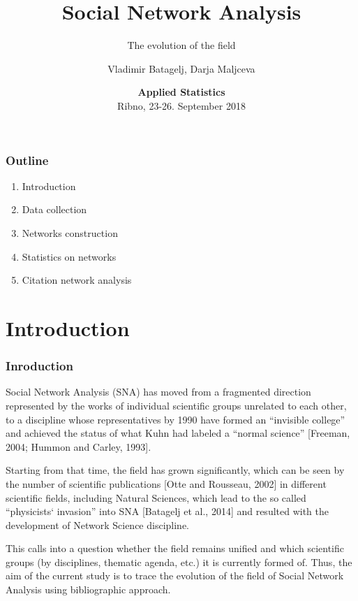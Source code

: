 \documentclass[hyperref={pdfstartview={FitBH -32768},
                         pdfpagemode=FullScreen,
                         plainpages=false,
                         colorlinks=true}
              ]{beamer}
\title[SNA. Evolution of the field]{\textbf{Social Network Analysis}}\subtitle{The evolution of the field}
\author[V. Batagelj, D. Maltseva]{Vladimir Batagelj, Darja Maljceva}
\institute[IMFM \& IAM UP]{IMFM Ljubljana, IAM UP Koper and NRU HSE Moscow }
\date[September 23-26, 2018]{\small
\textcolor{BrickRed}{\textbf{Applied Statistics}} \\
Ribno, 23-26. September 2018}
\newcommand{\clock}{\count254=\time \divide\count254 by 60
 \count255=\count254 \multiply\count255 by -60
 \advance\count255 by \time
 \ifnum\count254<10 0\fi\number\count254\,:\,%
 \ifnum\count255<10 0\fi\number\count255}
\begin{document}

\frame{\maketitle}

\begin{frame}
\frametitle{Outline}
\small
\begin{enumerate}
\item Introduction 
\item Data collection 
\item Networks construction 
\item Statistics on networks
\item Citation network analysis
\end{enumerate}




\end{frame}

\section{Introduction}

\begin{frame}[fragile]
\frametitle{Inroduction}
\small

Social Network Analysis (SNA) has moved from a fragmented direction represented by the works of individual scientific groups unrelated to each other, to a discipline whose representatives by 1990 have formed an “invisible college” and achieved the status of  what Kuhn had labeled a “normal science” [Freeman, 2004; Hummon and Carley, 1993]. \medskip

Starting from that time, the field has grown significantly, which can be seen by the number of scientific publications [Otte and Rousseau, 2002] in different scientific fields, including Natural Sciences, which lead to the so called “physicists` invasion” into SNA [Batagelj et al., 2014] and resulted with the development of Network Science discipline. \medskip

This calls into a question whether the field remains unified and which scientific groups (by disciplines, thematic agenda, etc.) it is currently formed of. Thus, the aim of the current study is to trace the evolution of the field of Social Network Analysis using bibliographic approach.  \medskip 

\end{frame}
\end{document}

